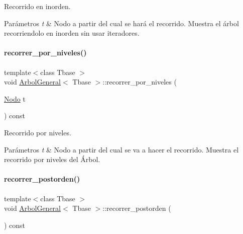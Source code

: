 Recorrido en inorden. 


\begin{DoxyParams}{Parámetros}
{\em t} & Nodo a partir del cual se hará el recorrido.  Muestra el árbol recorriendolo en inorden sin usar iteradores. \\
\hline
\end{DoxyParams}
\hypertarget{classArbolGeneral_ac6291959a1b891dc19e29c5ec9916417}{}\label{classArbolGeneral_ac6291959a1b891dc19e29c5ec9916417} 
\paragraph{\texorpdfstring{recorrer\+\_\+por\+\_\+niveles()}{recorrer\_por\_niveles()}}
{\footnotesize\ttfamily template$<$class Tbase $>$ \\
void \hyperlink{classArbolGeneral}{Arbol\+General}$<$ Tbase $>$\+::recorrer\+\_\+por\+\_\+niveles (\begin{DoxyParamCaption}\item[{\hyperlink{classArbolGeneral_a12cc1b74a9095d89bc7334290d332f7a}{Nodo}}]{t }\end{DoxyParamCaption}) const}



Recorrido por niveles. 


\begin{DoxyParams}{Parámetros}
{\em t} & Nodo a partir del cual se va a hacer el recorrido.  Muestra el recorrido por niveles del Árbol. \\
\hline
\end{DoxyParams}
\hypertarget{classArbolGeneral_a55ea6b4722f498562d1226d9e8d4c8f9}{}\label{classArbolGeneral_a55ea6b4722f498562d1226d9e8d4c8f9} 
\paragraph{\texorpdfstring{recorrer\+\_\+postorden()}{recorrer\_postorden()}}
{\footnotesize\ttfamily template$<$class Tbase $>$ \\
void \hyperlink{classArbolGeneral}{Arbol\+General}$<$ Tbase $>$\+::recorrer\+\_\+postorden (\begin{DoxyParamCaption}{ }\end{DoxyParamCaption}) const}



